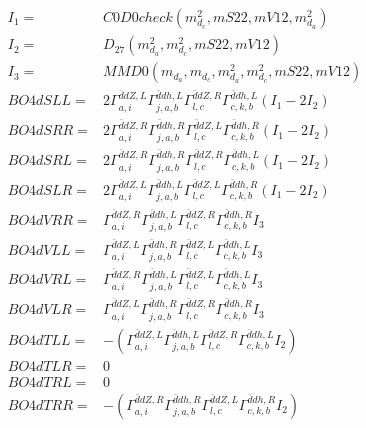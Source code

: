 \documentclass[A4,landscape]{article}
\begin{document}
\begin{align} 
I_1 = & C0D0check(m^2_{d_{{c}}}, mS22, mV12, m^2_{d_{{a}}}) \\ 
I_2 = & D_{27}(m^2_{d_{{a}}}, m^2_{d_{{c}}}, mS22, mV12) \\ 
I_3 = & MMD0(m_{d_{{a}}}, m_{d_{{c}}}, m^2_{d_{{a}}}, m^2_{d_{{c}}}, mS22, mV12) \\ 
  BO4dSLL= & 2  \Gamma^{\bar{d}d Z ,L}_{a, i} \Gamma^{\bar{d}d h ,L}_{j, a, b} \Gamma^{\bar{d}d Z ,R}_{l, c} \Gamma^{\bar{d}d h ,L}_{c, k, b} (I_1 - 2 I_2) \\ 
  BO4dSRR= & 2  \Gamma^{\bar{d}d Z ,R}_{a, i} \Gamma^{\bar{d}d h ,R}_{j, a, b} \Gamma^{\bar{d}d Z ,L}_{l, c} \Gamma^{\bar{d}d h ,R}_{c, k, b} (I_1 - 2 I_2) \\ 
  BO4dSRL= & 2  \Gamma^{\bar{d}d Z ,R}_{a, i} \Gamma^{\bar{d}d h ,R}_{j, a, b} \Gamma^{\bar{d}d Z ,R}_{l, c} \Gamma^{\bar{d}d h ,L}_{c, k, b} (I_1 - 2 I_2) \\ 
  BO4dSLR= & 2  \Gamma^{\bar{d}d Z ,L}_{a, i} \Gamma^{\bar{d}d h ,L}_{j, a, b} \Gamma^{\bar{d}d Z ,L}_{l, c} \Gamma^{\bar{d}d h ,R}_{c, k, b} (I_1 - 2 I_2) \\ 
  BO4dVRR= &  \Gamma^{\bar{d}d Z ,R}_{a, i} \Gamma^{\bar{d}d h ,L}_{j, a, b} \Gamma^{\bar{d}d Z ,R}_{l, c} \Gamma^{\bar{d}d h ,R}_{c, k, b} I_3 \\ 
  BO4dVLL= &  \Gamma^{\bar{d}d Z ,L}_{a, i} \Gamma^{\bar{d}d h ,R}_{j, a, b} \Gamma^{\bar{d}d Z ,L}_{l, c} \Gamma^{\bar{d}d h ,L}_{c, k, b} I_3 \\ 
  BO4dVRL= &  \Gamma^{\bar{d}d Z ,R}_{a, i} \Gamma^{\bar{d}d h ,L}_{j, a, b} \Gamma^{\bar{d}d Z ,L}_{l, c} \Gamma^{\bar{d}d h ,L}_{c, k, b} I_3 \\ 
  BO4dVLR= &  \Gamma^{\bar{d}d Z ,L}_{a, i} \Gamma^{\bar{d}d h ,R}_{j, a, b} \Gamma^{\bar{d}d Z ,R}_{l, c} \Gamma^{\bar{d}d h ,R}_{c, k, b} I_3 \\ 
  BO4dTLL= & -( \Gamma^{\bar{d}d Z ,L}_{a, i} \Gamma^{\bar{d}d h ,L}_{j, a, b} \Gamma^{\bar{d}d Z ,R}_{l, c} \Gamma^{\bar{d}d h ,L}_{c, k, b} I_2) \\ 
  BO4dTLR= & 0 \\ 
  BO4dTRL= & 0 \\ 
  BO4dTRR= & -( \Gamma^{\bar{d}d Z ,R}_{a, i} \Gamma^{\bar{d}d h ,R}_{j, a, b} \Gamma^{\bar{d}d Z ,L}_{l, c} \Gamma^{\bar{d}d h ,R}_{c, k, b} I_2) \\ 
\end{align} 
\end{document}
